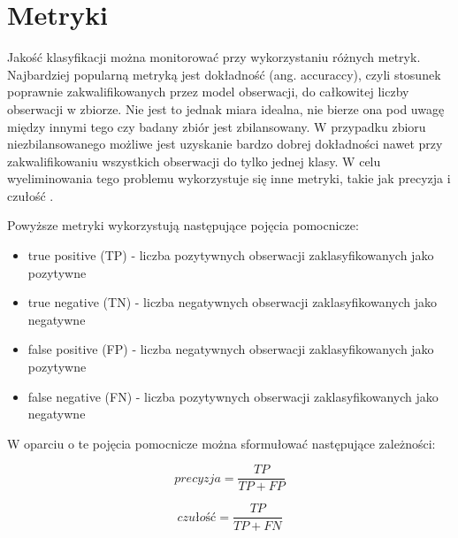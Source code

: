 \newpage %
\section{Metryki}

Jakość klasyfikacji można monitorować przy wykorzystaniu różnych metryk. Najbardziej popularną metryką jest dokładność (ang. accuraccy), czyli stosunek poprawnie zakwalifikowanych przez model obserwacji, do całkowitej liczby obserwacji w zbiorze. Nie jest to jednak miara idealna, nie bierze ona pod uwagę między innymi tego czy badany zbiór jest zbilansowany. W przypadku zbioru niezbilansowanego możliwe jest uzyskanie bardzo dobrej dokładności nawet przy zakwalifikowaniu wszystkich obserwacji do tylko jednej klasy. W celu wyeliminowania tego problemu wykorzystuje się inne metryki, takie jak precyzja i czułość \cite{metryki_3}.



\noindent Powyższe metryki wykorzystują następujące pojęcia pomocnicze:
\begin{itemize}
    \item true positive (TP) - liczba pozytywnych obserwacji zaklasyfikowanych jako pozytywne
    \item true negative (TN) - liczba negatywnych obserwacji zaklasyfikowanych jako negatywne
    \item false positive (FP) - liczba negatywnych obserwacji zaklasyfikowanych jako pozytywne
    \item false negative (FN) - liczba pozytywnych obserwacji zaklasyfikowanych jako negatywne
\end{itemize}


\noindent W oparciu o te pojęcia pomocnicze można sformułować następujące zależności:


$$
    precyzja = \frac{TP}{TP + FP}
$$

$$
    czułość = \frac{TP}{TP + FN}
$$





